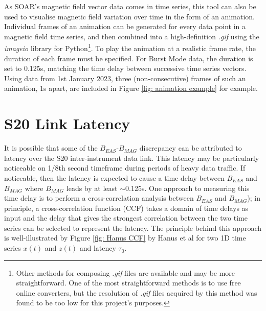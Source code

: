 As SOAR's magnetic field vector data comes in time series, this tool can also be used to visualise magnetic field variation over time in the form of an animation. Individual frames of an animation can be generated for every data point in a magnetic field time series, and then combined into a high-definition \textit{.gif} using the \textit{imageio} library for Python\cite{klein2024_imageio}\footnote{Other methods for composing \textit{.gif} files are available and may be more straightforward. One of the most straightforward methods is to use free online  converters, but the resolution of \textit{.gif} files acquired by this method was found to be too low for this project's purposes.}. To play the animation at a realistic frame rate, the duration of each frame must be specified. For Burst Mode data, the duration is set to 0.125s, matching the time delay between successive time series vectors. Using data from 1st January 2023, three (non-consecutive) frames of such an animation, 1s apart, are included in Figure \ref{fig: animation example} for example.
\\

\section{S20 Link Latency} \label{S20 method}
It is possible that some of the \(B_{EAS}\)-\(B_{MAG}\) discrepancy can be attributed to latency over the S20 inter-instrument data link\cite{owen2021}.  This latency may be particularly noticeable on 1/8th second timeframe during periods of heavy data traffic\cite{owen2021}. If noticeable, then the latency is expected to cause a time delay between \(B_{EAS}\) and \(B_{MAG}\) where \(B_{MAG}\) leads by at least \(\sim\)0.125s. One approach to measuring this time delay is to perform a cross-correlation analysis between \(B_{EAS}\) and \(B_{MAG}\)\cite{hanus2019}); in principle, a cross-correlation function (CCF) takes a domain of time delays as input and the delay that gives the strongest correlation between the two time series can be selected to represent the latency. The principle behind this approach is well-illustrated by Figure \ref{fig: Hanus CCF} by Hanus et al\cite{hanus2019} for two 1D time series \(x(t)\) and \(z(t)\) and latency \(\tau_0\).
\\

